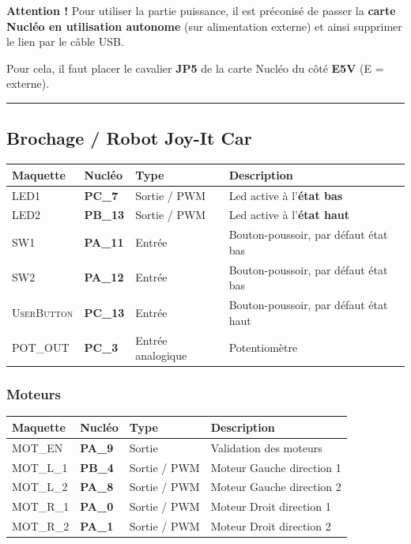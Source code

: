 \documentclass[a4paper,12pt,titlepage]{article} %
\begin{document}
\textbf{Attention !} Pour utiliser la partie puissance, il est préconisé de passer la \textbf{carte Nucléo en utilisation autonome} (sur alimentation externe) et ainsi supprimer le lien par le câble USB.

Pour cela, il faut placer le cavalier \textbf{JP5} de la carte Nucléo du côté \textbf{E5V} (E = externe).

\noindent \rule{\linewidth}{1pt}


\newpage
\subsection{Brochage / Robot Joy-It Car}

\begin{center}
\begin{tabular}{|l|l|l|l|}
\hline 
Maquette & \textbf{Nucléo} & Type & Description \\ 
\hline 
\textsc{LED1} & \textbf{PC\_7} & Sortie / PWM & Led active à l'\textbf{état bas}\\ 
\textsc{LED2} & \textbf{PB\_13} & Sortie / PWM & Led active à l'\textbf{état haut}\\ 
\hline 
\textsc{SW1} & \textbf{PA\_11} & Entrée & Bouton-poussoir, par défaut état bas\\ 
\textsc{SW2} & \textbf{PA\_12} & Entrée & Bouton-poussoir, par défaut état bas\\ 
\textsc{UserButton} & \textbf{PC\_13} & Entrée & Bouton-poussoir, par défaut état haut\\
\hline  
\textsc{POT\_OUT} & \textbf{PC\_3} & Entrée analogique & Potentiomètre\\
\hline  
\end{tabular} 
\end{center}

\subsubsection{Moteurs}

\begin{center}
\begin{tabular}{|l|l|l|l|}
\hline 
Maquette & \textbf{Nucléo} & Type & Description \\ 
\hline 
\textsc{MOT\_EN} & \textbf{PA\_9} & Sortie & Validation des moteurs\\ 
\hline 
\textsc{MOT\_L\_1} & \textbf{PB\_4} & Sortie / PWM & Moteur Gauche direction 1\\ 
\textsc{MOT\_L\_2} & \textbf{PA\_8} & Sortie / PWM & Moteur Gauche direction 2\\ 
\hline 
\textsc{MOT\_R\_1} & \textbf{PA\_0} & Sortie / PWM & Moteur Droit direction 1\\ 
\textsc{MOT\_R\_2} & \textbf{PA\_1} & Sortie / PWM & Moteur Droit direction 2\\ 
\hline  
\end{tabular} 
\end{center}
\end{document}
